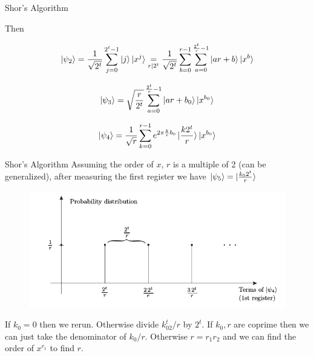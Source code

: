 \documentclass{beamer}
\begin{document}
\begin{frame}{Shor's Algorithm}

Then


\[
\ket{\psi_2}=\frac{1}{\sqrt{2^t}}\sum_{j=0}^{2^t-1}\ket{j}\ket{x^j} \underset{r|2^t}{=} \frac{1}{\sqrt{2^t}}\sum_{b=0}^{r-1}\sum_{a=0}^{\frac{2^t}{r}-1}\ket{ar+b}\ket{x^b}
\]


\[
\ket{\psi_3}=\sqrt{\frac{r}{2^t}}\sum_{a=0}^{\frac{2^t}{r}-1}\ket{ar+b_0}\ket{x^{b_0}}
\]


\[
\ket{\psi_4}=\frac{1}{\sqrt{r}}\sum_{k=0}^{r-1}e^{2\pi \frac{k}{r}b_0}\ket{\frac{k2^t}{r}}\ket{x^{b_0}}
\]
\end{frame}
\begin{frame}{Shor's Algorithm}
Assuming the order of $x$, $r$ is a multiple of 2 (can be generalized), after measuring the first register we have $\ket{\psi_5}=\ket{\frac{k_0 2^t}{r}}$

\begin{figure}[ht]
  \includegraphics[scale=.5]{pasted6}
\end{figure}

If $k_0=0$ then we rerun. Otherwise divide $k_02^t/r$  by $2^t$. If $k_0,r$ are coprime then we can just take the denominator of $k_0/r$. Otherwise $r=r_1 r_2$ and we can find the order of $x^{r_1}$ to find $r$.

\end{frame}
\end{document}
